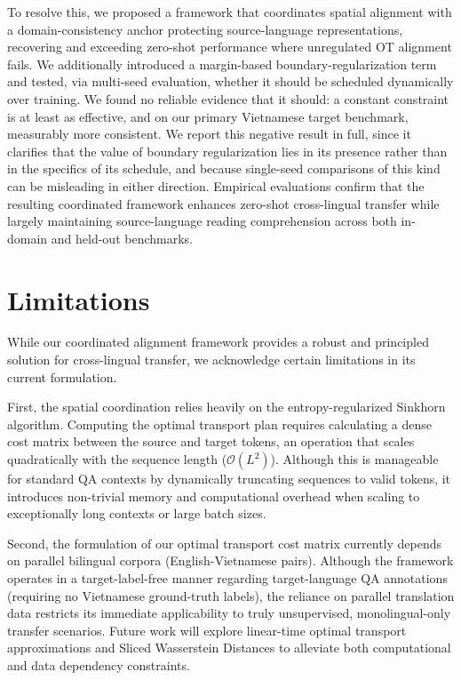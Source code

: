 \documentclass[11pt]{article}
\begin{document}
To resolve this, we proposed a framework that coordinates spatial alignment with a domain-consistency anchor protecting source-language representations, recovering and exceeding zero-shot performance where unregulated OT alignment fails. We additionally introduced a margin-based boundary-regularization term and tested, via multi-seed evaluation, whether it should be scheduled dynamically over training. We found no reliable evidence that it should: a constant constraint is at least as effective, and on our primary Vietnamese target benchmark, measurably more consistent. We report this negative result in full, since it clarifies that the value of boundary regularization lies in its presence rather than in the specifics of its schedule, and because single-seed comparisons of this kind can be misleading in either direction. Empirical evaluations confirm that the resulting coordinated framework enhances zero-shot cross-lingual transfer while largely maintaining source-language reading comprehension across both in-domain and held-out benchmarks.

\section*{Limitations}
While our coordinated alignment framework provides a robust and principled solution for cross-lingual transfer, we acknowledge certain limitations in its current formulation. 

First, the spatial coordination relies heavily on the entropy-regularized Sinkhorn algorithm. Computing the optimal transport plan requires calculating a dense cost matrix between the source and target tokens, an operation that scales quadratically with the sequence length ($\mathcal{O}(L^2)$). Although this is manageable for standard QA contexts by dynamically truncating sequences to valid tokens, it introduces non-trivial memory and computational overhead when scaling to exceptionally long contexts or large batch sizes. 

Second, the formulation of our optimal transport cost matrix currently depends on parallel bilingual corpora (English-Vietnamese pairs). Although the framework operates in a target-label-free manner regarding target-language QA annotations (requiring no Vietnamese ground-truth labels), the reliance on parallel translation data restricts its immediate applicability to truly unsupervised, monolingual-only transfer scenarios. Future work will explore linear-time optimal transport approximations and Sliced Wasserstein Distances to alleviate both computational and data dependency constraints.
\end{document}
